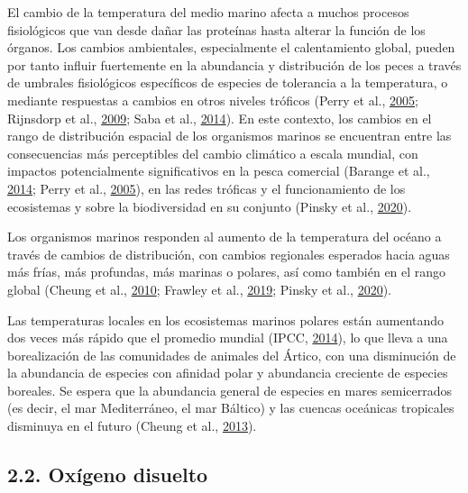\documentclass[
]{article}
\begin{document}
El cambio de la temperatura del medio marino afecta a muchos procesos
fisiológicos que van desde dañar las proteínas hasta alterar la función
de los órganos. Los cambios ambientales, especialmente el calentamiento
global, pueden por tanto influir fuertemente en la abundancia y
distribución de los peces a través de umbrales fisiológicos específicos
de especies de tolerancia a la temperatura, o mediante respuestas a
cambios en otros niveles tróficos (Perry et al.,
\protect\hyperlink{ref-Perry2005}{2005}; Rijnsdorp et al.,
\protect\hyperlink{ref-Rijnsdorp2009}{2009}; Saba et al.,
\protect\hyperlink{ref-Saba2014}{2014}). En este contexto, los cambios
en el rango de distribución espacial de los organismos marinos se
encuentran entre las consecuencias más perceptibles del cambio climático
a escala mundial, con impactos potencialmente significativos en la pesca
comercial (Barange et al., \protect\hyperlink{ref-Barange2014}{2014};
Perry et al., \protect\hyperlink{ref-Perry2005}{2005}), en las redes
tróficas y el funcionamiento de los ecosistemas y sobre la biodiversidad
en su conjunto (Pinsky et al.,
\protect\hyperlink{ref-Pinsky2020}{2020}).

Los organismos marinos responden al aumento de la temperatura del océano
a través de cambios de distribución, con cambios regionales esperados
hacia aguas más frías, más profundas, más marinas o polares, así como
también en el rango global (Cheung et al.,
\protect\hyperlink{ref-Cheung2010a}{2010}; Frawley et al.,
\protect\hyperlink{ref-Frawley2019}{2019}; Pinsky et al.,
\protect\hyperlink{ref-Pinsky2020}{2020}).

Las temperaturas locales en los ecosistemas marinos polares están
aumentando dos veces más rápido que el promedio mundial (IPCC,
\protect\hyperlink{ref-IPCC2014}{2014}), lo que lleva a una
borealización de las comunidades de animales del Ártico, con una
disminución de la abundancia de especies con afinidad polar y abundancia
creciente de especies boreales. Se espera que la abundancia general de
especies en mares semicerrados (es decir, el mar Mediterráneo, el mar
Báltico) y las cuencas oceánicas tropicales disminuya en el futuro
(Cheung et al., \protect\hyperlink{ref-Cheung2013}{2013}).

\pagebreak

\hypertarget{oxuxedgeno-disuelto}{%
\subsection{2.2. Oxígeno disuelto}\label{oxuxedgeno-disuelto}}
\end{document}
